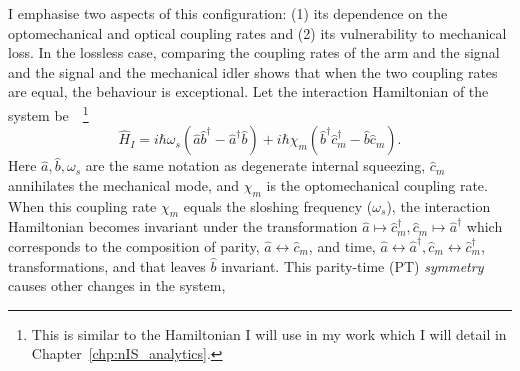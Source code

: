 I emphasise two aspects of this configuration: (1) its dependence on the optomechanical and optical coupling rates and (2) its vulnerability to mechanical loss. %
In the lossless case, comparing the coupling rates of the arm and the signal and the signal and the mechanical idler shows that when the two coupling rates are equal, the behaviour is exceptional.
Let the interaction Hamiltonian of the system be~\cite{liBroadbandSensitivityImprovement2020}~\footnote{This is similar to the Hamiltonian I will use in my work which I will detail in Chapter~\ref{chp:nIS_analytics}.}
\begin{equation}\label{eq:sWLC_HI}
\hat{H}_I=i\hbar\omega_s(\hat{a}\hat{b}^\dag-\hat{a}^\dag\hat{b})+i\hbar\chi_m(\hat{b}^\dag\hat{c}_m^\dag-\hat{b}\hat{c}_m).
\end{equation}
Here $\hat a, \hat b, \omega_s$ are the same notation as degenerate internal squeezing, $\hat{c}_m$ annihilates the mechanical mode, and $\chi_m$ is the optomechanical coupling rate. When this coupling rate $\chi_m$ equals the sloshing frequency ($\omega_s$), the interaction Hamiltonian becomes invariant under the transformation $\hat a\mapsto\hat{c}_m^\dag, \hat{c}_m\mapsto\hat a^\dag$ which corresponds to the composition of parity, $\hat a\leftrightarrow \hat{c}_m$, and time, $\hat a\leftrightarrow \hat a^\dag,\hat {c}_m\leftrightarrow \hat {c}_m^\dag$, transformations, and that leaves $\hat b$ invariant. This parity-time (PT) \emph{symmetry} causes other changes in the system, 

